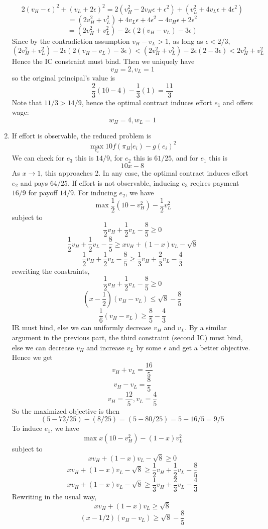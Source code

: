 \documentclass[10pt,letter]{article}
\begin{document}
\begin{enumerate}[label=(\alph*)]
\[2 (v_H - \epsilon)^2 + (v_L + 2\epsilon)^2 = 2(v_H^2 - 2v_H\epsilon + \epsilon^2) + (v_L^2 + 4v_L\epsilon + 4\epsilon^2) \]
\[ = (2v_H^2 + v_L^2) + 4v_L\epsilon + 4\epsilon^2 - 4v_H\epsilon + 2\epsilon^2 \]
\[ = (2v_H^2 + v_L^2) - 2\epsilon(2(v_H - v_L) - 3\epsilon )  \]
Since by the contradiction assumption $v_H - v_L > 1$, as long as $\epsilon < 2/3$,
\[ (2v_H^2 + v_L^2) - 2\epsilon(2(v_H - v_L) - 3\epsilon ) <  (2v_H^2 + v_L^2) - 2\epsilon(2 - 3\epsilon) <  2v_H^2 + v_L^2 \]
Hence the IC constraint must bind. Then we uniquely have
\[ v_H = 2, v_L = 1 \]
so the original principal's value is
\[ \frac{2}{3}(10 - 4) - \frac{1}{3}(1) = \frac{11}{3} \]
Note that $11/3 > 14/9$, hence the optimal contract induces effort $e_1$ and offers wage:
\[ w_H = 4, w_L = 1 \]
\item If effort is observable, the reduced problem is
\[ \max_{e_i} 10 f(\pi_H|e_i)  - g(e_i)^2 \]
We can check for $e_3$ this is $14/9$, for $e_2$ this is $61/25$, and for $e_1$ this is
\[ 10x - 8 \]
As $x \to 1$, this approaches 2. In any case, the optimal contract induces effort $e_2$ and pays $64/25$. If effort is not observable, inducing $e_3$ reqires payment $16/9$ for payoff $14/9$. For inducing $e_2$, we have
\[ \max \frac{1}{2}(10 - v_H^2) - \frac{1}{2} v_L^2 \]
subject to
\[ \frac{1}{2}v_H + \frac{1}{2} v_L - \frac{8}{5} \ge 0 \]
\[ \frac{1}{2}v_H + \frac{1}{2} v_L - \frac{8}{5} \ge xv_H + (1-x)v_L - \sqrt{8} \]
\[ \frac{1}{2}v_H + \frac{1}{2} v_L - \frac{8}{5} \ge \frac{1}{3}v_H + \frac{2}{3}v_L - \frac{4}{3} \]
rewriting the constraints,
\[ \frac{1}{2}v_H + \frac{1}{2} v_L - \frac{8}{5} \ge 0 \]
\[ (x - \frac{1}{2})(v_H - v_L)  \le  \sqrt{8} - \frac{8}{5} \]
\[ \frac{1}{6}(v_H - v_L)  \ge \frac{8}{5} - \frac{4}{3} \]
IR must bind, else we can uniformly  decrease $v_H$ and $v_L$. By a similar argument in the previous part, the third constraint (second IC) must bind, else we can decrease $v_H$ and increase $v_L$ by some $\epsilon$ and get a better objective. Hence we get
\[ v_H + v_L = \frac{16}{5}  \]
\[ v_H - v_L  =  \frac{8}{5}  \]
\[ v_H = \frac{12}{5}, v_L = \frac{4}{5} \]
So the maximized objective is then
\[ (5 - 72/25) - (8/25) = (5 - 80/25) = 5 - 16/5 = 9/5 \]
To induce $e_1$, we have
\[ \max x(10 - v_H^2) - (1-x) v_L^2 \]
subject to
\[ xv_H + (1-x)v_L - \sqrt{8} \ge 0 \]
\[ xv_H + (1-x)v_L - \sqrt{8} \ge \frac{1}{2}v_H + \frac{1}{2} v_L - \frac{8}{5} \]
\[ xv_H + (1-x)v_L - \sqrt{8} \ge \frac{1}{3}v_H + \frac{2}{3}v_L - \frac{4}{3} \]
Rewriting in the usual way,
\[ xv_H + (1-x)v_L \ge  \sqrt{8} \]
\[ (x - 1/2)(v_H- v_L) \ge  \sqrt{8}  - \frac{8}{5} \]

\end{enumerate}
\end{document}
